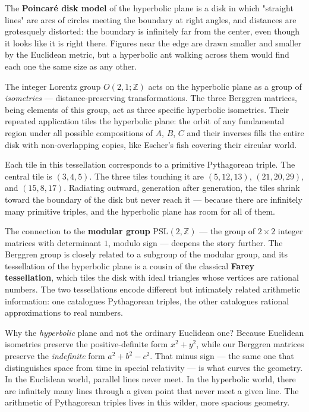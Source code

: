 The \textbf{Poincaré disk model} of the hyperbolic plane is a disk in which "straight lines" are arcs of circles meeting the boundary at right angles, and distances are grotesquely distorted: the boundary is infinitely far from the center, even though it looks like it is right there. Figures near the edge are drawn smaller and smaller by the Euclidean metric, but a hyperbolic ant walking across them would find each one the same size as any other.

The integer Lorentz group $O(2,1; \mathbb{Z})$ acts on the hyperbolic plane as a group of \textit{isometries} --- distance-preserving transformations. The three Berggren matrices, being elements of this group, act as three specific hyperbolic isometries. Their repeated application tiles the hyperbolic plane: the orbit of any fundamental region under all possible compositions of $A$, $B$, $C$ and their inverses fills the entire disk with non-overlapping copies, like Escher's fish covering their circular world.

Each tile in this tessellation corresponds to a primitive Pythagorean triple. The central tile is $(3, 4, 5)$. The three tiles touching it are $(5, 12, 13)$, $(21, 20, 29)$, and $(15, 8, 17)$. Radiating outward, generation after generation, the tiles shrink toward the boundary of the disk but never reach it --- because there are infinitely many primitive triples, and the hyperbolic plane has room for all of them.

The connection to the \textbf{modular group} $\text{PSL}(2, \mathbb{Z})$ --- the group of $2 \times 2$ integer matrices with determinant $1$, modulo sign --- deepens the story further. The Berggren group is closely related to a subgroup of the modular group, and its tessellation of the hyperbolic plane is a cousin of the classical \textbf{Farey tessellation}, which tiles the disk with ideal triangles whose vertices are rational numbers. The two tessellations encode different but intimately related arithmetic information: one catalogues Pythagorean triples, the other catalogues rational approximations to real numbers.

Why the \textit{hyperbolic} plane and not the ordinary Euclidean one? Because Euclidean isometries preserve the positive-definite form $x^2 + y^2$, while our Berggren matrices preserve the \textit{indefinite} form $a^2 + b^2 - c^2$. That minus sign --- the same one that distinguishes space from time in special relativity --- is what curves the geometry. In the Euclidean world, parallel lines never meet. In the hyperbolic world, there are infinitely many lines through a given point that never meet a given line. The arithmetic of Pythagorean triples lives in this wilder, more spacious geometry.

